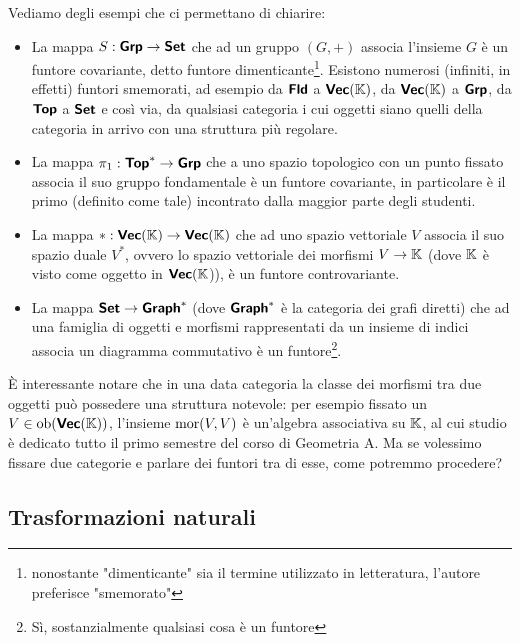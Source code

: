 \documentclass{article}
\begin{document}
Vediamo degli esempi che ci permettano di chiarire:\begin{itemize}
    \item La mappa $S:\text{\sffamily\textbf{Grp}} \to \text{\sffamily\textbf{Set}}$ che ad un gruppo $(G,+)$ associa l'insieme $G$ è un funtore covariante, detto funtore dimenticante\footnote{nonostante "dimenticante" sia il termine utilizzato in letteratura, l'autore preferisce "smemorato"}. Esistono numerosi (infiniti, in effetti) funtori smemorati, ad esempio da $\text{\sffamily\textbf{Fld}}$ a $\text{\sffamily\textbf{Vec}}(\mathbb{K})$, da $\text{\sffamily\textbf{Vec}}(\mathbb{K})$ a $\text{\sffamily\textbf{Grp}}$, da $\text{\sffamily\textbf{Top}}$ a $\text{\sffamily\textbf{Set}}$ e così via, da qualsiasi categoria i cui oggetti siano quelli della categoria in arrivo con una struttura più regolare.
    \item La mappa $\pi_1 : \text{\sffamily\textbf{Top}}^* \to \text{\sffamily\textbf{Grp}}$ che a uno spazio topologico con un punto fissato associa il suo gruppo fondamentale è un funtore covariante, in particolare è il primo (definito come tale) incontrato dalla maggior parte degli studenti.
    \item La mappa $*:\text{\sffamily\textbf{Vec}}(\mathbb{K}) \to \text{\sffamily\textbf{Vec}}(\mathbb{K}) $ che ad uno spazio vettoriale $V$ associa il suo spazio duale $V^*$, ovvero lo spazio vettoriale dei morfismi $V \to \mathbb{K}$ (dove $\mathbb{K}$ è visto come oggetto in $\text{\sffamily\textbf{Vec}}(\mathbb{K}$)), è un funtore controvariante.
    \item La mappa $\text{\sffamily\textbf{Set}} \to \text{\sffamily\textbf{Graph}}^*$ (dove $\text{\sffamily\textbf{Graph}}^*$ è la categoria dei grafi diretti) che ad una famiglia di oggetti e morfismi rappresentati da un insieme di indici associa un diagramma commutativo è un funtore\footnote{Sì, sostanzialmente qualsiasi cosa è un funtore}.
\end{itemize}

È interessante notare che in una data categoria la classe dei morfismi tra due oggetti può possedere una struttura notevole: per esempio fissato un $V \in \operatorname{ob}(\text{\sffamily\textbf{Vec}}(\mathbb{K}))$, l'insieme $\operatorname{mor}(V,V)$ è un'algebra associativa su $\mathbb{K}$, al cui studio è dedicato tutto il primo semestre del corso di Geometria A. Ma se volessimo fissare due categorie e parlare dei funtori tra di esse, come potremmo procedere?

\subsection{Trasformazioni naturali}
\end{document}
